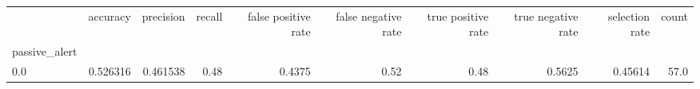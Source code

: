 \begin{tabular}{lrrrrrrrrr}
\toprule
{} &  accuracy &  precision &  recall &  false positive rate &  false negative rate &  true positive rate &  true negative rate &  selection rate &  count \\
passive\_alert &           &            &         &                      &                      &                     &                     &                 &        \\
\midrule
0.0           &  0.526316 &   0.461538 &    0.48 &               0.4375 &                 0.52 &                0.48 &              0.5625 &         0.45614 &   57.0 \\
\bottomrule
\end{tabular}
